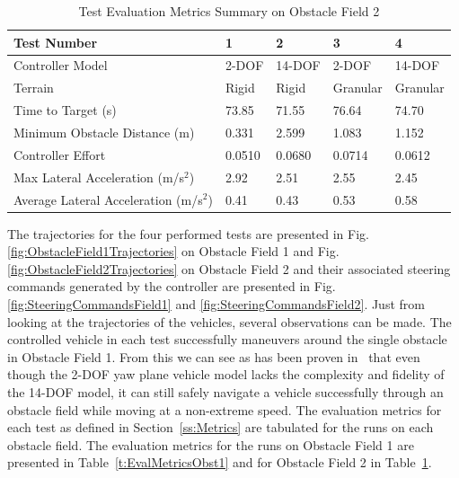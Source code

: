 \documentclass[12pt,twocolumn]{article}
\begin{document}
\begin{table}
		\centering
\begin{tabular}{ ||p{5cm}|p{2cm}|p{2cm}|p{2cm}|p{2cm}||  }
		\hline
		Test Number & 1 & 2 & 3 & 4\\
		\hline
		Controller Model & 2-DOF & 14-DOF & 2-DOF & 14-DOF\\
		\hline
		Terrain & Rigid & Rigid & Granular & Granular\\
		\hline
		Time to Target (s)  & 73.85 & 71.55 & 76.64 & 74.70\\ 
		\hline
		Minimum Obstacle Distance (m) & 0.331 & 2.599 & 1.083 & 1.152\\
		\hline
		Controller Effort & 0.0510 & 0.0680 & 0.0714 & 0.0612\\
		\hline
		Max Lateral Acceleration (m/s$^{2}$)& 2.92 & 2.51 & 2.55 & 2.45 \\
		\hline
		Average Lateral Acceleration (m/s$^{2}$) & 0.41 & 0.43 & 0.53 & 0.58\\
		\hline
\end{tabular}
\caption{Test Evaluation Metrics Summary on Obstacle Field 2}
\label{t:EvalMetricsObst2}
\end{table}

The trajectories for the four performed tests are presented in Fig. \ref{fig:ObstacleField1Trajectories} on Obstacle Field 1 and Fig. \ref{fig:ObstacleField2Trajectories}  on Obstacle Field 2 and their associated steering commands generated by the controller are presented in Fig. \ref{fig:SteeringCommandsField1} and \ref{fig:SteeringCommandsField2}. Just from looking at the trajectories of the vehicles, several observations can be made. The controlled vehicle in each test successfully maneuvers around the single obstacle in Obstacle Field 1. From this we can see as has been proven in~\cite{ModelFidelity2016} that even though the 2-DOF yaw plane vehicle model lacks the complexity and fidelity of the 14-DOF model, it can still safely navigate a vehicle successfully through an obstacle field while moving at a non-extreme speed. The evaluation metrics for each test as defined in Section~\ref{ss:Metrics} are tabulated for the runs on each obstacle field. The evaluation metrics for the runs on Obstacle Field 1 are presented in Table~\ref{t:EvalMetricsObst1} and for Obstacle Field 2 in Table~\ref{t:EvalMetricsObst2}. 
\end{document}
